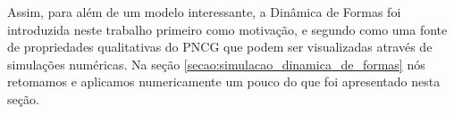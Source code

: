 Assim, para além de um modelo interessante, a Dinâmica de Formas foi introduzida neste trabalho primeiro como motivação, e segundo como uma fonte de propriedades qualitativas do PNCG que podem ser visualizadas através de simulações numéricas. Na seção \ref{secao:simulacao_dinamica_de_formas} nós retomamos e aplicamos numericamente um pouco do que foi apresentado nesta seção.




